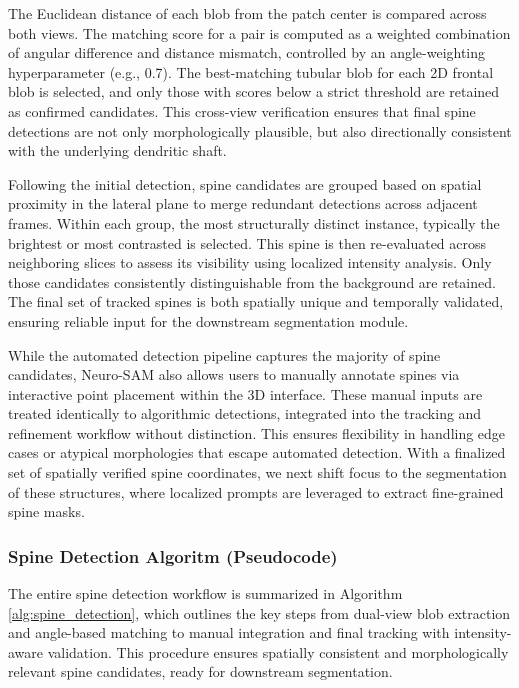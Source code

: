 The Euclidean distance of each blob from the patch center is compared across both views. The matching score for a pair is computed as a weighted combination of angular difference and distance mismatch, controlled by an angle-weighting hyperparameter (e.g., 0.7). The best-matching tubular blob for each 2D frontal blob is selected, and only those with scores below a strict threshold are retained as confirmed candidates. This cross-view verification ensures that final spine detections are not only morphologically plausible, but also directionally consistent with the underlying dendritic shaft.

Following the initial detection, spine candidates are grouped based on spatial proximity in the lateral plane to merge redundant detections across adjacent frames. Within each group, the most structurally distinct instance, typically the brightest or most contrasted is selected. This spine is then re-evaluated across neighboring slices to assess its visibility using localized intensity analysis. Only those candidates consistently distinguishable from the background are retained. The final set of tracked spines is both spatially unique and temporally validated, ensuring reliable input for the downstream segmentation module.

While the automated detection pipeline captures the majority of spine candidates, Neuro-\gls{SAM} also allows users to manually annotate spines via interactive point placement within the 3D interface. These manual inputs are treated identically to algorithmic detections, integrated into the tracking and refinement workflow without distinction. This ensures flexibility in handling edge cases or atypical morphologies that escape automated detection. With a finalized set of spatially verified spine coordinates, we next shift focus to the segmentation of these structures, where localized prompts are leveraged to extract fine-grained spine masks.

\subsubsection{\textbf{Spine Detection Algoritm (Pseudocode)}}

The entire spine detection workflow is summarized in Algorithm \ref{alg:spine_detection}, which outlines the key steps from dual-view blob extraction and angle-based matching to manual integration and final tracking with intensity-aware validation. This procedure ensures spatially consistent and morphologically relevant spine candidates, ready for downstream segmentation.

